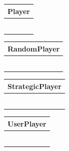 \documentclass[12pt]{article}
\begin{document}
\begin{enumerate}[1.]
    \begin{figure}[H]
        \centering
        \begin{tabular}{|p{3.25cm}|}
            \hline
            \textbf{Player}\\
            \hline
            \\
            \\
            \\
            \hline
            \\
            \\
            \\
            \hline
        \end{tabular}
        \begin{tabular}{|p{3.25cm}|}
            \hline
            \textbf{RandomPlayer}\\
            \hline
            \\
            \\
            \\
            \hline
            \\
            \\
            \\
            \hline
        \end{tabular}
        \begin{tabular}{|p{3.25cm}|}
            \hline
            \textbf{StrategicPlayer}\\
            \hline
            \\
            \\
            \\
            \hline
            \\
            \\
            \\
            \hline
        \end{tabular}
        \begin{tabular}{|p{3.25cm}|}
            \hline
            \textbf{UserPlayer}\\
            \hline
            \\
            \\
            \\
            \hline
            \\
            \\
            \\
            \hline
        \end{tabular}
    \end{figure}


\end{enumerate}
\end{document}
